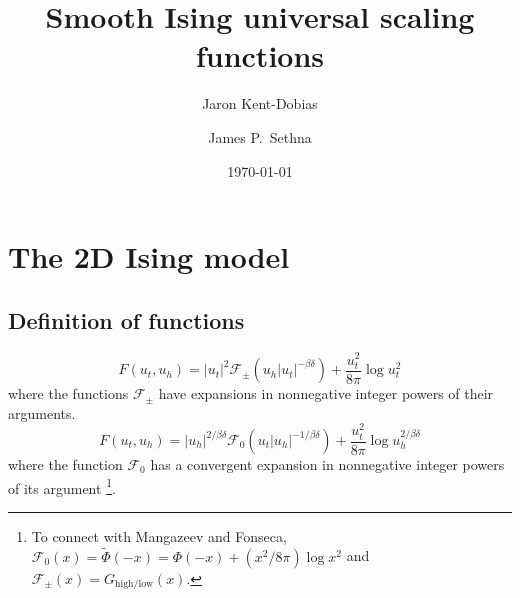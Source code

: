 \documentclass[
  aps,
  prb,
  reprint,
  longbibliography,
  floatfix
]{revtex4-2}
\begin{document}
\title{Smooth Ising universal scaling functions}

\author{Jaron Kent-Dobias}

\author{James P.~Sethna}

\date\today

\begin{abstract}
\end{abstract}

\maketitle

\cite{Campostrini_2000_Critical}


\section{The 2D Ising model}

\subsection{Definition of functions}

\begin{equation} \label{eq:free.energy.2d.low}
  F(u_t, u_h)
  = |u_t|^2\mathcal F_{\pm}(u_h|u_t|^{-\beta\delta})
    +\frac{u_t^2}{8\pi}\log u_t^2
\end{equation}
where the functions $\mathcal F_\pm$ have expansions in nonnegative integer powers of their arguments.
\begin{equation} \label{eq:free.energy.2d.mid}
  F(u_t, u_h)
  = |u_h|^{2/\beta\delta}\mathcal F_0(u_t|u_h|^{-1/\beta\delta})
    +\frac{u_t^2}{8\pi}\log u_h^{2/\beta\delta}
\end{equation}
where the function $\mathcal F_0$ has a convergent expansion in nonnegative integer powers of its argument \footnote{
  To connect with Mangazeev and Fonseca, $\mathcal F_0(x)=\tilde\Phi(-x)=\Phi(-x)+(x^2/8\pi) \log x^2$ and $\mathcal F_\pm(x)=G_{\mathrm{high}/\mathrm{low}}(x)$.
}.
\end{document}
